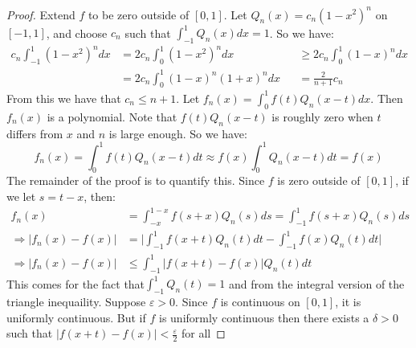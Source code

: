 \documentclass[crop=false,class=book,oneside]{standalone}
\begin{document}
            \begin{proof}
                    Extend $f$ to be zero outside of $[0,1]$. Let
                    $Q_{n}(x)=c_{n}(1-x^{2})^{n}$ on $[-1,1]$,
                    and choose $c_{n}$ such that
                    $\int_{-1}^{1}Q_{n}(x)dx=1$. So we have:
                    \begin{align*}
                        c_{n}\int_{-1}^{1}(1-x^{2})^{n}dx
                        &=2c_{n}\int_{0}^{1}(1-x^{2})^{n}dx
                        &
                        &\geq{2c_{n}}\int_{0}^{1}(1-x)^{n}dx\\
                        &=2c_{n}\int_{0}^{1}(1-x)^{n}(1+x)^{n}dx
                        &
                        &=\frac{2}{n+1}c_{n}
                    \end{align*}
                From this we have that $c_{n}\leq{n+1}$. Let
                $f_{n}(x)=\int_{0}^{1}f(t)Q_{n}(x-t)dx$.
                Then $f_{n}(x)$ is a polynomial. Note that
                $f(t)Q_{n}(x-t)$ is roughly zero when $t$ differs
                from $x$ and $n$ is large enough. So we have:
                \begin{equation*}
                    f_{n}(x)=\int_{0}^{1}f(t)Q_{n}(x-t)dt
                    \approx{f(x)}\int_{0}^{1}Q_{n}(x-t)dt=f(x)
                \end{equation*}
                The remainder of the proof is to quantify this.
                Since $f$ is zero outside of $[0,1]$, if
                we let $s=t-x$, then:
                \begin{align*}
                    f_{n}(x)&=\int_{-x}^{1-x}f(s+x)Q_{n}(s)ds
                    =\int_{-1}^{1}f(s+x)Q_{n}(s)ds\\
                    \Rightarrow|f_{n}(x)-f(x)|
                    &=\bigg|\int_{-1}^{1}f(x+t)Q_{n}(t)dt
                    -\int_{-1}^{1}f(x)Q_{n}(t)dt\bigg|\\
                    \Rightarrow|f_{n}(x)-f(x)|
                    &\leq\int_{-1}^{1}|f(x+t)-f(x)|Q_{n}(t)dt
                \end{align*}
                This comes for the fact that$\int_{-1}^{1}Q_{n}(t)=1$
                and from the integral version of the triangle
                inequaility.
                Suppose $\varepsilon>0$. Since $f$ is continuous
                on $[0,1]$, it is uniformly continuous. But
                if $f$ is uniformly continuous then there exists
                a $\delta>0$ such that
                $|f(x+t)-f(x)|<\frac{\varepsilon}{2}$ for all

\end{proof}
\end{document}
